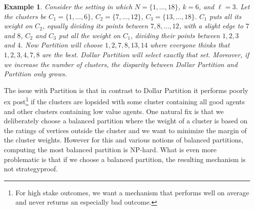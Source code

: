 \documentclass[letterpaper]{article}
\newtheorem{example}[theorem]{Example}
\begin{document}
\begin{example}
Consider the setting in which	$N=\{1,\ldots, 18\}$, $k=6$, and $\ell=3$. Let the clusters be $C_1=\{1,\ldots, 6\}$, $C_2=\{7,\ldots, 12\}$, $C_3=\{13,\ldots, 18\}$. $C_1$ puts all its weight on $C_2$, equally dividing its points between $7,8,\ldots,12$, with a slight edge to $7$ and $8$, $C_2$ and $C_3$ put all the weight on $C_1$, dividing their points between $1,2,3$ and $4$. Now Partition will choose $1,2,7,8,13,14$ where everyone thinks that $1,2,3,4,7,8$ are the best. Dollar Partition will select exactly that set. Moreover, if we increase the number of clusters, the disparity between Dollar Partition and Partition only grows.
	\end{example}
	
The issue with Partition is that in contrast to Dollar Partition it performs poorly ex post\footnote{For high stake outcomes, we want a mechanism that performs well on average and never returns an especially bad outcome.} if the clusters are lopsided with some cluster containing all good agents and other clusters containing low value agents. One natural fix is that we deliberately choose a balanced partition where the weight of a cluster is based on the ratings of vertices outside the cluster and we want to minimize the margin of the cluster weights.
However for this and various notions of balanced partitions, computing the most balanced partition is NP-hard. What is even more problematic is that if we choose a balanced partition, the resulting mechanism is not strategyproof.%
\end{document}
